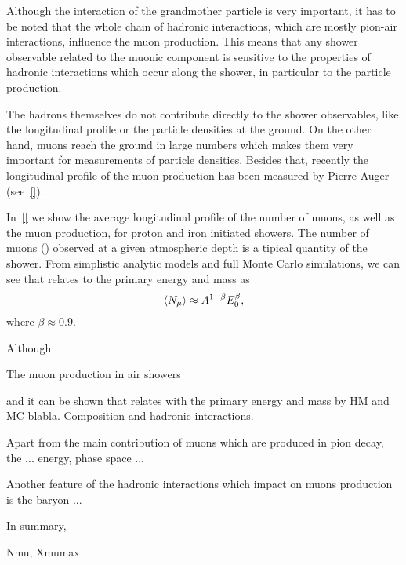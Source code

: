Although the interaction of the grandmother particle is very important,
it has to be noted that the whole chain of hadronic interactions, which are
mostly pion-air interactions, influence the muon production. This means
that any shower observable related to the muonic component is sensitive to the
properties of hadronic interactions which occur along the shower, in particular
to the particle production. 













The hadrons themselves do not contribute directly to the shower observables,
like the longitudinal profile or the particle densities at the ground.
On the other hand, muons reach the ground in large numbers which makes them
very important for measurements of particle densities. Besides that,
recently the longitudinal profile of the muon production has been measured 
by Pierre Auger (see~\cref{}).


In~\cref{} we show the average longitudinal profile of
the number of muons, as well as the muon production,
for proton and iron initiated showers. The number of muons (\nmu) observed
at a given atmospheric depth is a tipical quantity of the shower.
From simplistic analytic models and full Monte Carlo simulations,
we can see that \nmu relates to the primary energy and mass as
\begin{equation}
  \mbox{$\langle N_\mu\rangle$} \approx A^{1-\beta} E_0^\beta,
\end{equation}
where $\beta\approx 0.9$. 

Although 

The muon production in air showers 




and it can be shown that \nmu relates with the primary energy and mass by
HM and MC blabla. Composition and hadronic interactions.


Apart from the main contribution of muons which are produced in pion decay,
the ...
energy, phase space ...


Another feature of the hadronic interactions which impact on muons production
is the baryon ...

In summary, 







Nmu, Xmumax   

